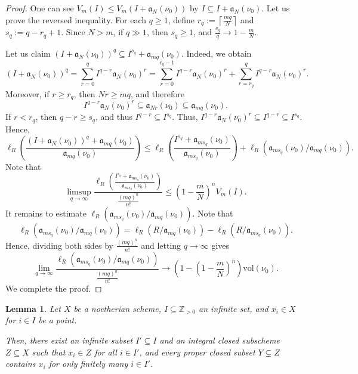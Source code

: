 \documentclass[a4paper,12pt]{amsart}
\newtheorem{lemma}[theorem]{Lemma}
\theoremstyle{definition} %
\theoremstyle{remark}
\numberwithin{equation}{section}
\newcommand{\Z}{\mathbb{Z}}
\newcommand{\ceil}[1]{\left\lceil #1 \right \rceil}
\begin{document}
\begin{proof}
One can see $V_m(I)\le V_m(I+\mathfrak{a}_{N}(\nu_0))$ by $I\subseteq I+\mathfrak{a}_N(\nu_0)$. Let us prove the reversed inequality. For each $q\ge 1$, define $r_q:=\ceil{\frac{mq}{N}}$ and $s_q:=q-r_q+1$. Since $N>m$, if $q\gg 1$, then $s_q\ge 1$, and $\frac{s_q}{q}\to 1-\frac{m}{N}$.

\smallskip

Let us claim $(I+\mathfrak{a}_{N}(\nu_0))^q\subseteq I^{s_q}+\mathfrak{a}_{mq}(\nu_0)$. Indeed, we obtain
$$ (I+\mathfrak{a}_N(\nu_0))^q=\sum^q_{r=0}I^{q-r}\mathfrak{a}_{N}(\nu_0)^r=\sum^{r_q-1}_{r=0}I^{q-r}\mathfrak{a}_{N}(\nu_0)^r+\sum^q_{r=r_q}I^{q-r}\mathfrak{a}_{N}(\nu_0)^r.$$
Moreover, if $r\ge r_q$, then $Nr\ge mq$, and therefore
$$ I^{q-r}\mathfrak{a}_{N}(\nu_0)^r\subseteq \mathfrak{a}_{Nr}(\nu_0)\subseteq \mathfrak{a}_{mq}(\nu_0).$$
If $r<r_q$, then $q-r\ge s_q$, and thus $I^{q-r}\subseteq I^{s_q}$. Thus, $I^{q-r}\mathfrak{a}_{N}(\nu_0)^r\subseteq I^{q-r}\subseteq I^{s_q}$.
Hence,
$$ \ell_R\left(\frac{(I+\mathfrak{a}_{N}(\nu_0))^q+\mathfrak{a}_{mq}(\nu_0)}{\mathfrak{a}_{mq}(\nu_0)}\right)\le \ell_R\left(\frac{I^{s_q}+\mathfrak{a}_{ms_q}(\nu_0)}{\mathfrak{a}_{ms_q}(\nu_0)}\right)+\ell_R(\mathfrak{a}_{ms_q}(\nu_0)/\mathfrak{a}_{mq}(\nu_0)).$$
Note that
$$ \limsup_{q\to \infty}\frac{\ell_R\left(\frac{I^{s_q}+\mathfrak{a}_{ms_q}(\nu_0)}{\mathfrak{a}_{ms_q}(\nu_0)}\right)}{\frac{(mq)^n}{n!}}\le \left(1-\frac{m}{N}\right)^nV_m(I).$$
It remains to estimate $\ell_R(\mathfrak{a}_{ms_q}(\nu_0)/\mathfrak{a}_{mq}(\nu_0))$. Note that
$$ \ell_R(\mathfrak{a}_{ms_q}(\nu_0)/\mathfrak{a}_{mq}(\nu_0))=\ell_R(R/\mathfrak{a}_{mq}(\nu_0))-\ell_R(R/\mathfrak{a}_{ms_q}(\nu_0)).$$
Hence, dividing both sides by $\frac{(mq)^n}{n!}$ and letting $q\to \infty$ gives
$$ \lim_{q\to \infty}\frac{\ell_R(\mathfrak{a}_{ms_q}(\nu_0)/\mathfrak{a}_{mq}(\nu_0))}{\frac{(mq)^n}{n!}}\to \left(1-\left(1-\frac{m}{N}\right)^n\right)\mathrm{vol}(\nu_0).$$
We complete the proof.
\end{proof}

\begin{lemma} \label{lemma}
Let $X$ be a noetherian scheme, $I\subseteq \Z_{>0}$ an infinite set, and $x_i\in X$ for $i\in I$ be a point.

\smallskip

Then, there exist an infinite subset $I'\subseteq I$ and an integral closed subscheme $Z\subseteq X$ such that $x_i\in Z$ for all $i\in I'$, and every proper closed subset $Y\subsetneq Z$ contains $x_i$ for only finitely many $i\in I'$.
\end{lemma}
\end{document}
